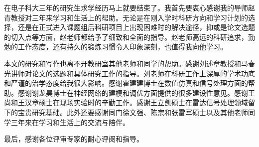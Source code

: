 
\thesisacknowledgement
在电子科大三年的研究生求学经历马上就要结束了。我首先要衷心感谢我的导师赵青教授对三年来学习和生活上的帮助。无论是在刚入学时科研方向和学习计划的选择，还是在正式进入课题组后科研项目上出现困难时的解决途径，抑或是论文选题的切入点等方面，赵老师都给予了细致和全面的指导。赵老师高远的科研追求，勤勉的工作态度，还有持久的锻炼习惯令人印象深刻，也值得我向他学习。

本文的研究和写作也离不开教研室其他老师和同学的帮助。感谢刘述章教授和马春光讲师对论文的选题和具体研究工作的指导。刘老师在科研工作上深厚的学术功底和严谨的治学态度给我很大影响。感谢霍建建博士在数值仿真和信号处理方面的帮助。感谢谢龙昊博士在神经网络的建模和调优方面提供的很多建设性意见。感谢王尚和王汉章硕士在现场实验时的辛勤工作。感谢王立凯硕士在雷达信号处理领域留下的宝贵研究基础。此外还要感谢同门徐文强、陈宗和张雷军硕士以及其他老师同学三年来在学习和生活上的交流与陪伴。

最后，感谢各位评审专家的耐心评阅和指导。